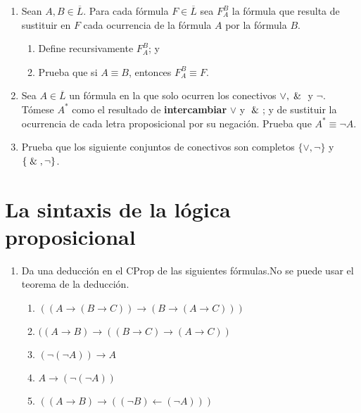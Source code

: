 \documentclass[letterpaper,DIV=15,headsepline,12pt]{scrartcl}
\begin{document}
\begin{enumerate}
\begin{enumerate}
                \end{enumerate} 
            \item Sean $A, B\in\overline{L}$. Para cada fórmula $F\in\overline{L}$ sea $F_A^B$ la fórmula que resulta de sustituir en $F$ cada ocurrencia de la fórmula $A$ por la fórmula $B$.
                \begin{enumerate}
                    \item Define recursivamente $F_A^B$; y
                    \item Prueba que si $A\equiv B$, entonces $F_A^B\equiv F$.
                \end{enumerate}
            \item Sea $A\in\overline{L}$ un fórmula en la que solo ocurren los conectivos $\vee ,\And$ y $\neg$. Tómese $A^*$ como el resultado de \textbf{intercambiar} $\vee$ y $\And$; y de sustituir la ocurrencia de cada letra proposicional por su negación. Prueba que $A^*\equiv \neg A$.
            \item Prueba que los siguiente conjuntos de conectivos son completos $\{\vee, \neg\}$ y $\{\And ,\neg\}$.
        \end{enumerate}
    
    \newpage
    \section*{La sintaxis de la lógica proposicional}
        \begin{enumerate}
            \item Da una deducción en el CProp de las siguientes fórmulas.No se puede usar el teorema de la deducción.
                \begin{enumerate}
                    \item $((A\longrightarrow (B\longrightarrow C))\longrightarrow (B\longrightarrow (A\longrightarrow C)))$
                    \item $((A\longrightarrow B)\longrightarrow ((B\longrightarrow C)\longrightarrow (A\longrightarrow C))$
                    \item  $(\neg (\neg A))\longrightarrow A$
                    \item $A\longrightarrow (\neg (\neg A))$
                    \item  $((A\longrightarrow B)\longrightarrow ((\neg B)\longleftarrow(\neg A)))$
                \end{enumerate}
        \end{enumerate}
    
\end{document}
